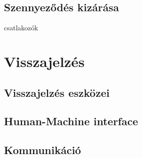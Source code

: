\subsection{Szennyeződés kizárása}
csatlakozók

\section{Visszajelzés}

\subsection{Visszajelzés eszközei}

\subsection{Human-Machine interface}

\subsection{Kommunikáció}
